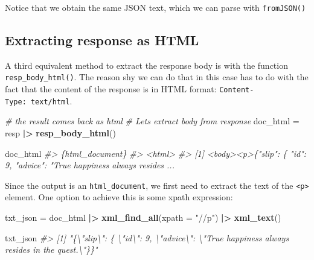 \documentclass[
]{book}
\newenvironment{Shaded}{\begin{snugshade}}{\end{snugshade}}
\newcommand{\AttributeTok}[1]{\textcolor[rgb]{0.13,0.29,0.53}{#1}}
\newcommand{\CommentTok}[1]{\textcolor[rgb]{0.56,0.35,0.01}{\textit{#1}}}
\newcommand{\FunctionTok}[1]{\textcolor[rgb]{0.13,0.29,0.53}{\textbf{#1}}}
\newcommand{\NormalTok}[1]{#1}
\newcommand{\OtherTok}[1]{\textcolor[rgb]{0.56,0.35,0.01}{#1}}
\newcommand{\SpecialCharTok}[1]{\textcolor[rgb]{0.81,0.36,0.00}{\textbf{#1}}}
\newcommand{\StringTok}[1]{\textcolor[rgb]{0.31,0.60,0.02}{#1}}
\begin{document}
Notice that we obtain the same JSON text, which we can parse with \texttt{fromJSON()}

\begin{Shaded}
\end{Shaded}

\hypertarget{extracting-response-as-html}{%
\subsection{Extracting response as HTML}\label{extracting-response-as-html}}

A third equivalent method to extract the response body is with the function
\texttt{resp\_body\_html()}. The reason shy we can do that in this case has to do with
the fact that the content of the response is in HTML format:
\texttt{Content-Type:\ text/html}.

\begin{Shaded}
\begin{Highlighting}[]
\CommentTok{\# the result comes back as html}
\CommentTok{\# Let\textquotesingle{}s extract body from response}
\NormalTok{doc\_html }\OtherTok{=}\NormalTok{ resp }\SpecialCharTok{|\textgreater{}} \FunctionTok{resp\_body\_html}\NormalTok{()}

\NormalTok{doc\_html}
\CommentTok{\#\textgreater{} \{html\_document\}}
\CommentTok{\#\textgreater{} \textless{}html\textgreater{}}
\CommentTok{\#\textgreater{} [1] \textless{}body\textgreater{}\textless{}p\textgreater{}\{"slip": \{ "id": 9, "advice": "True happiness always resides ...}
\end{Highlighting}
\end{Shaded}

Since the output is an \texttt{html\_document}, we first need to extract the text of
the \texttt{\textless{}p\textgreater{}} element. One option to achieve this is some xpath expression:

\begin{Shaded}
\begin{Highlighting}[]
\NormalTok{txt\_json }\OtherTok{=}\NormalTok{ doc\_html }\SpecialCharTok{|\textgreater{}} 
  \FunctionTok{xml\_find\_all}\NormalTok{(}\AttributeTok{xpath =} \StringTok{"//p"}\NormalTok{) }\SpecialCharTok{|\textgreater{}}
  \FunctionTok{xml\_text}\NormalTok{()}

\NormalTok{txt\_json}
\CommentTok{\#\textgreater{} [1] "\{\textbackslash{}"slip\textbackslash{}": \{ \textbackslash{}"id\textbackslash{}": 9, \textbackslash{}"advice\textbackslash{}": \textbackslash{}"True happiness always resides in the quest.\textbackslash{}"\}\}"}
\end{Highlighting}
\end{Shaded}
\end{document}
